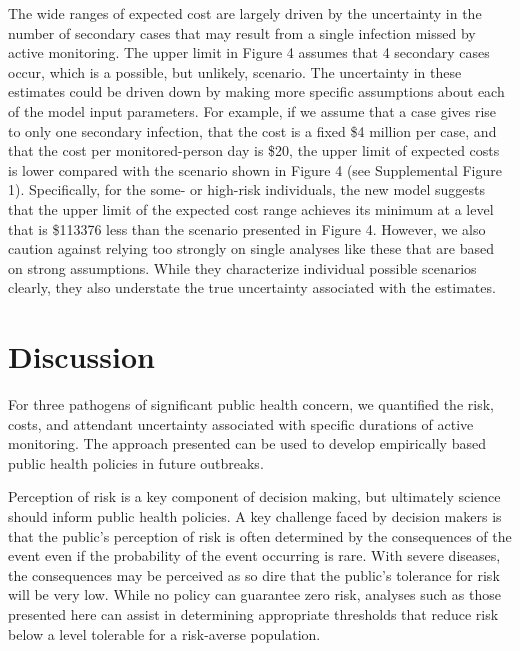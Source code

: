 \documentclass[]{article}
\begin{document}
The wide ranges of expected cost are largely driven by the uncertainty
in the number of secondary cases that may result from a single infection
missed by active monitoring. The upper limit in Figure 4 assumes that 4
secondary cases occur, which is a possible, but unlikely, scenario. The
uncertainty in these estimates could be driven down by making more
specific assumptions about each of the model input parameters. For
example, if we assume that a case gives rise to only one secondary
infection, that the cost is a fixed \$4 million per case, and that the
cost per monitored-person day is \$20, the upper limit of expected costs
is lower compared with the scenario shown in Figure 4 (see Supplemental
Figure 1). Specifically, for the some- or high-risk individuals, the new
model suggests that the upper limit of the expected cost range achieves
its minimum at a level that is \$113376 less than the scenario presented
in Figure 4. However, we also caution against relying too strongly on
single analyses like these that are based on strong assumptions. While
they characterize individual possible scenarios clearly, they also
understate the true uncertainty associated with the estimates.

\section{Discussion}\label{discussion}

For three pathogens of significant public health concern, we quantified
the risk, costs, and attendant uncertainty associated with specific
durations of active monitoring. The approach presented can be used to
develop empirically based public health policies in future outbreaks.

Perception of risk is a key component of decision making, but ultimately
science should inform public health policies. A key challenge faced by
decision makers is that the public's perception of risk is often
determined by the consequences of the event even if the probability of
the event occurring is rare. With severe diseases, the consequences may
be perceived as so dire that the public's tolerance for risk will be
very low. While no policy can guarantee zero risk, analyses such as
those presented here can assist in determining appropriate thresholds
that reduce risk below a level tolerable for a risk-averse population.
\end{document}
